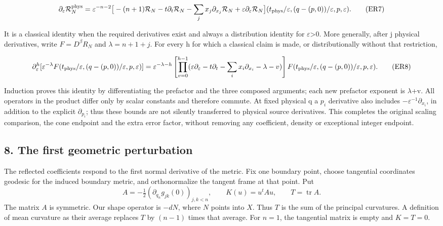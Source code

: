 \documentclass[
  11pt,
]{article}
\begin{document}
\[
 \partial_\varepsilon\mathcal R_N^{\rm phys}
 =\varepsilon^{-n-2}
 \big[-(n+1)\mathcal R_N-t\partial_t\mathcal R_N
       -\sum_jx_j\partial_{x_j}\mathcal R_N
       +\varepsilon\partial_\varepsilon\mathcal R_N\big]
        (t_{\rm phys}/\varepsilon,(q-(p,0))/\varepsilon,p,\varepsilon).
 \tag{ER7}
\]

It is a classical identity when the required derivatives exist and
always a distribution identity for \ensuremath{\varepsilon}\textgreater0. More generally, after
j physical derivatives, write \(F=D^\beta  R_N\) and \(\lambda =n+1+j\).
For every h for which a classical claim is made, or distributionally
without that restriction,

{\small
\[
 \partial_\varepsilon^h[\varepsilon^{-\lambda}F(t_{\rm phys}/\varepsilon,
                  (q-(p,0))/\varepsilon,p,\varepsilon)]
 =\varepsilon^{-\lambda-h}
  \left[\prod_{v=0}^{h-1}
    (\varepsilon\partial_\varepsilon-t\partial_t
        -\sum_ix_i\partial_{x_i}-\lambda-v)\right]F
       (t_{\rm phys}/\varepsilon,(q-(p,0))/\varepsilon,p,\varepsilon).
 \tag{ER8}
\]
}

Induction proves this identity by differentiating the prefactor and the
three composed arguments; each new prefactor exponent is \ensuremath{\lambda}+v. All
operators in the product differ only by scalar constants and therefore
commute. At fixed physical q a \ensuremath{p_i} derivative also includes
\(-\varepsilon ^{-1}\partial _{x_i}\), in addition to the explicit
\(\partial _{p_i}\); thus these bounds are not silently transferred to
physical source derivatives. This completes the original scaling
comparison, the cone endpoint and the extra error factor, without
removing any coefficient, density or exceptional integer endpoint.

\subsection{8. The first geometric
perturbation}\label{the-first-geometric-perturbation}

The reflected coefficients respond to the first normal derivative of the
metric. Fix one boundary point, choose tangential coordinates geodesic
for the induced boundary metric, and orthonormalize the tangent frame at
that point. Put \[
 A=-\tfrac12(\partial_{q_n}g_{jk}(0))_{j,k<n},\qquad
 K(u)=u^tAu,\qquad T=\operatorname{tr}A.
 \tag{R30}
\] The matrix \(A\) is symmetric. Our shape operator is \(-dN\), where
\(N\) points into \(X\). Thus \(T\) is the sum of the principal
curvatures. A definition of mean curvature as their average replaces
\(T\) by \((n-1)\) times that average. For \(n=1\), the tangential
matrix is empty and \(K=T=0\).
\end{document}
